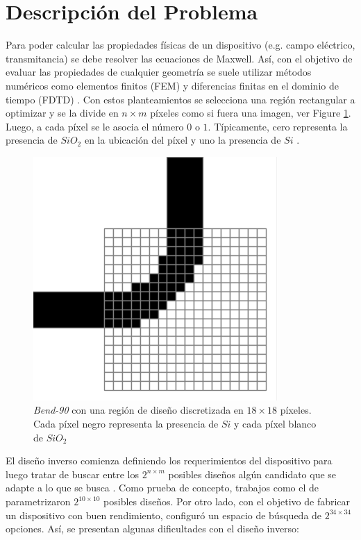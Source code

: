 \section{Descripción del  Problema}


Para poder calcular las propiedades físicas de un dispositivo (e.g. campo eléctrico, transmitancia) se debe resolver las ecuaciones de Maxwell.
Así, con el objetivo de evaluar las propiedades de cualquier geometría se suele utilizar métodos numéricos como elementos finitos (FEM) y diferencias finitas en el dominio de tiempo (FDTD) \citep{Schneider2019}.
Con estos planteamientos se selecciona una región rectangular a optimizar y se la divide  en $n \times m$  píxeles como si fuera una imagen, ver Figure \ref{fig:bend-discretization}. 
Luego, a cada píxel se le asocia el número $0$ o $1$.
Típicamente, cero representa la presencia de $SiO_2$ en la ubicación del píxel y uno la presencia de $Si$ \citep{Molesky2018}.

\begin{figure}[h]
  \centering
  \includegraphics[scale=0.6]{image/introduction/bend-discretization.png}
  \caption{\emph{Bend-90} con una región de diseño discretizada en $18 \times 18$ píxeles. Cada píxel negro representa la presencia de $Si$ y cada píxel blanco de $SiO_2$}
  \label{fig:bend-discretization}
\end{figure}

El diseño inverso comienza definiendo los requerimientos del dispositivo para luego tratar de buscar entre los $2^{n \times m}$ posibles diseños algún candidato que se adapte a lo que se busca \citep{Su2020, Molesky2018}.
Como prueba de concepto, trabajos como el de \cite{Malheiros-Silveira2020} parametrizaron $2^{10 \times 10}$ posibles diseños.
Por otro lado, \cite{Su2020} con el objetivo de fabricar un dispositivo con buen rendimiento, configuró un espacio de búsqueda de $2^{34 \times 34}$ opciones.
Así, se presentan algunas dificultades con el diseño inverso:

